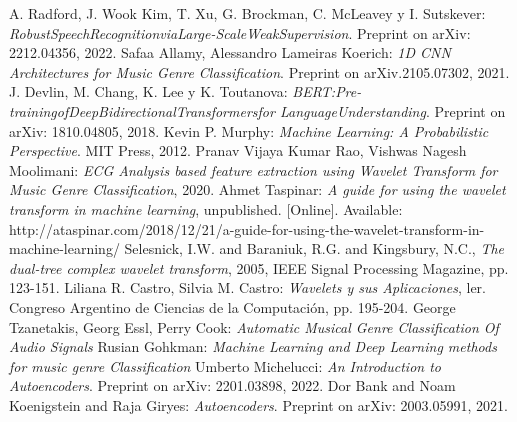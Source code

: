 \documentclass[colorinlistoftodos,twoside,twocolumn,10pt]{article} %
\begin{document}
	    
	\begin{thebibliography}{20}
		 A. Radford, J. Wook Kim, T. Xu, G. Brockman, C. McLeavey y I. Sutskever: \emph{RobustSpeechRecognitionviaLarge-ScaleWeakSupervision}. Preprint on arXiv: 2212.04356, 2022. 	
		 Safaa Allamy, Alessandro Lameiras Koerich: \emph{1D CNN Architectures for Music Genre Classification}. Preprint on arXiv.2105.07302, 2021. 
		 J. Devlin, M. Chang, K. Lee y K. Toutanova: \emph{BERT:Pre-trainingofDeepBidirectionalTransformersfor LanguageUnderstanding}. Preprint on arXiv: 1810.04805, 2018. 
		 Kevin P. Murphy: \emph{Machine Learning: A Probabilistic Perspective}. MIT Press, 2012.
		 Pranav Vijaya Kumar Rao, Vishwas Nagesh Moolimani: \emph{ECG Analysis based feature extraction using Wavelet Transform for Music Genre Classification}, 2020. 
		 Ahmet Taspinar: \emph{A guide for using the wavelet transform in machine learning}, unpublished. [Online]. Available: http://ataspinar.com/2018/12/21/a-guide-for-using-the-wavelet-transform-in-machine-learning/
		 Selesnick, I.W. and Baraniuk, R.G. and Kingsbury, N.C., \emph{The dual-tree complex wavelet transform}, 2005, IEEE Signal Processing Magazine, pp. 123-151.
		 Liliana R. Castro, Silvia M.  Castro: \emph{Wavelets y sus Aplicaciones}, ler. Congreso Argentino de Ciencias de la Computación, pp. 195-204.
		 George Tzanetakis, Georg Essl, Perry Cook: \emph{Automatic Musical Genre Classification Of Audio Signals}
		 Rusian Gohkman: \emph{Machine Learning and Deep Learning methods for music genre Classification}
		 Umberto Michelucci: \emph{An Introduction to Autoencoders}. Preprint on arXiv: 2201.03898, 2022.
		 Dor Bank and Noam Koenigstein and Raja Giryes: \emph{Autoencoders}. Preprint on arXiv: 2003.05991, 2021.
    \end{thebibliography}
	
\end{document}
